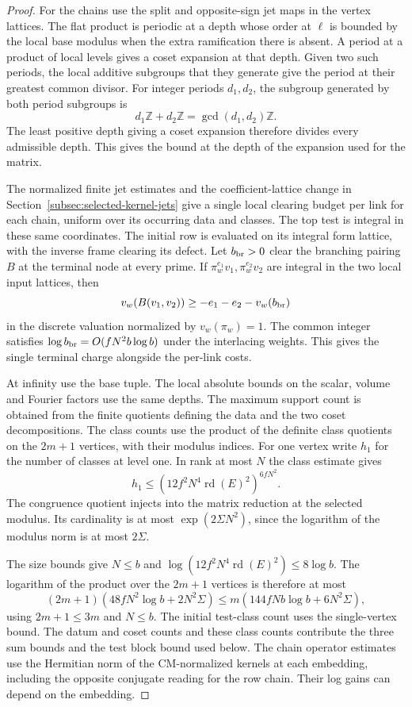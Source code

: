 \begin{proof}
For the chains use the split and opposite-sign jet maps
in the vertex lattices. The flat product is periodic at a
depth whose order at \(\ell\) is bounded by the local base
modulus when the extra ramification there is absent. A
period at a product of local levels gives a coset expansion
at that depth. Given two such periods, the local additive
subgroups that they generate give the period at their
greatest common divisor.
For integer periods \(d_1,d_2\), the subgroup generated by both period subgroups is
\[
  d_1\mathbb Z+d_2\mathbb Z=\gcd(d_1,d_2)\mathbb Z .
\]
 The least positive depth giving a
coset expansion therefore divides every admissible depth.
This gives the bound at the depth of the expansion used
for the matrix.

The normalized finite jet estimates and the
coefficient-lattice change in Section~\ref{subsec:selected-kernel-jets}
give a single local clearing budget per link for each chain,
uniform over its occurring data and classes. The top test
is integral in these same coordinates. The initial row is
evaluated on its integral form lattice, with the inverse frame
clearing its defect. Let \(b_{\rm br}>0\) clear the branching
pairing \(B\) at the terminal node at every prime. If
\(\pi_w^{e_1}v_1,\pi_w^{e_2}v_2\) are integral in the two
local input lattices, then
\[
 v_w(B(v_1,v_2))\ge-e_1-e_2-v_w(b_{\rm br})
\]
in the discrete valuation normalized by \(v_w(\pi_w)=1\).
The common integer satisfies \(\log b_{\rm br}=O(fN^2 b\log b)\)
under the interlacing weights. This gives the single terminal
charge alongside the per-link costs. \label{cor:fitted-evaluation-5}


At infinity use the base tuple. The local absolute bounds on
the scalar, volume and Fourier factors use the same depths.
The maximum support count is obtained from the finite
quotients defining the data and the two coset decompositions.
The class counts use the product of the definite class
quotients on the \(2m+1\) vertices, with their modulus indices.
For one vertex write \(h_1\) for the number of classes at level one. In rank at most \(N\) the class estimate gives
\[
  h_1\le(12f^2N^4\operatorname{rd}(E)^2)^{6fN^2}.
\]
The congruence quotient injects into the matrix reduction at
the selected modulus. Its cardinality is at most
\(\exp(2\Sigma N^2)\), since the logarithm of the modulus
norm is at most \(2\Sigma\).

The size bounds give \(N\le b\) and
\(\log(12f^2N^4\operatorname{rd}(E)^2)\le8\log b\).
The logarithm of the product over the \(2m+1\)
vertices is therefore at most
\[
 (2m+1)(48fN^2\log b+2N^2\Sigma)
           \le m(144fNb\log b+6N^2\Sigma),
\]
using \(2m+1\le3m\) and \(N\le b\).
The initial test-class count uses the single-vertex bound.
The datum and coset counts and these class counts contribute
the three sum bounds and the test block bound used below.
The chain operator estimates use the
Hermitian norm of the CM-normalized kernels at each
embedding, including the opposite conjugate reading for the
row chain. Their log gains can depend on the embedding.


\end{proof}
